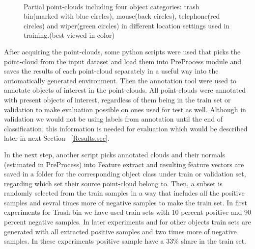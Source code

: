 \begin{figure} [htp]
\begin{center}
     \\
  \end{center}
  \caption[Train set point-clouds including four different object class.]
  {Partial point-clouds including four object categories: trash bin(marked with blue circles), mouse(back circles), telephone(red circles) and wiper(green circles) in different location settings used in training.(best viewed in color)}
  \label{TrainClouds2.figure:edge}
\end{figure}




After acquiring the point-clouds, some python scripts were used that picks the point-cloud from the input dataset 
and load them into PreProcess module and saves the results of each point-cloud separately in a useful way into the automatically
generated environment. 
Then the annotation tool were used to annotate objects of interest in the point-clouds. 
All point-clouds were annotated with present objects of interest, regardless of them being in the train set or validation to 
make evaluation possible on ones used for test as well. 
Although in validation we would not be using labels from annotation until the end of classification, 
this information is needed for evaluation which would be described later in next Section ~\ref{Results.sec}.


In the next step, another script picks annotated clouds and their normals (estimated in PreProcess) into Feature extract 
and  resulting feature vectors are saved in a folder for the corresponding object class under train or validation set, regarding
which set their source point-cloud belong to.
Then, a subset is randomly selected from the train samples in a way that includes all the positive samples and sevral times more of 
 negative samples to make the train set.
In first experiments for Trash bin we have used train sets with 10 percent positive and 90 percent negative samples.
In later experiments and for other objects train sets are generated with all extracted positive samples and two times more of negative samples.
In these experiments positive sample have a 33\% share in the train set.

